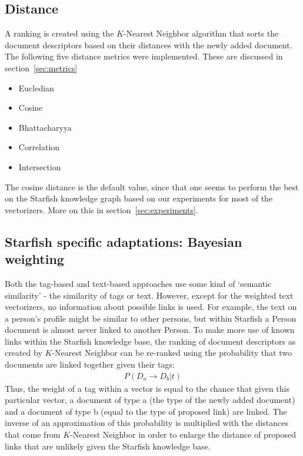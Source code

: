 \subsection{Distance}
A ranking is created using the $K$-Nearest Neighbor algorithm that sorts the
document descriptors based on their distances with the newly added document.
The following five distance metrics were implemented. These are discussed
in section~\ref{sec:metrics}

\begin{itemize}
\item Eucledian
\item Cosine
\item Bhattacharyya
\item Correlation
\item Intersection
\end{itemize}

The cosine distance is the default value, since that one seems to perform the
best on the Starfish knowledge graph based on our experiments for most of the vectorizers. 
More on this in section~\ref{sec:experiments}. 

\subsection{Starfish specific adaptations: Bayesian weighting}
Both the tag-based and text-based approaches use some kind of `semantic similarity' - the similarity of tags or text. However, except for the weighted text vectorizers, no information about possible links is used. For example, the text on a person's profile might be similar to other persons, but within Starfish a Person document is almost never linked to another Person. To make more use of known links within the Starfish knowledge base, the ranking of document descriptors as created by $K$-Nearest Neighbor can be re-ranked using the probability that two documents are linked together given their tags:
\begin{align}
\nonumber P(D_a \rightarrow D_b | t)
\end{align}
Thus, the weight of a tag within a vector is equal to the chance that given this particular vector, a document of type a (the type of the newly added document) and a document of type b (equal to the type of proposed link) are linked. The inverse of an approximation of this probability is multiplied with the distances that come from $K$-Nearest Neighbor in order to enlarge the distance of proposed links that are unlikely given the Starfish knowledge base. 

